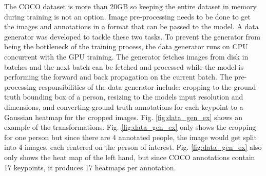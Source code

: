 \documentclass[11pt, letterpaper]{article}
\begin{document}
The COCO dataset is more than 20GB so keeping the entire dataset in memory during training is not an option. Image pre-processing needs to be done to get the images and annotations in a format that can be passed to the model. A data generator was developed to tackle these two tasks. To prevent the generator from being the bottleneck of the training process, the data generator runs on CPU concurrent with the GPU training. The generator fetches images from disk in batches and the next batch can be fetched and processed while the model is performing the forward and back propagation on the current batch. The pre-processing responsibilities of the data generator include: cropping to the ground truth bounding box of a person, resizing to the models input resolution and dimensions, and converting ground truth annotations for each keypoint to a Gaussian heatmap for the cropped images. Fig. \ref{fig:data_gen_ex} shows an example of the transformations. Fig. \ref{fig:data_gen_ex} only shows the cropping for one person but since there are 4 annotated people, the image would get split into 4 images, each centered on the person of interest. Fig. \ref{fig:data_gen_ex} also only shows the heat map of the left hand, but since COCO annotations contain 17 keypoints, it produces 17 heatmaps per annotation. 
\end{document}
